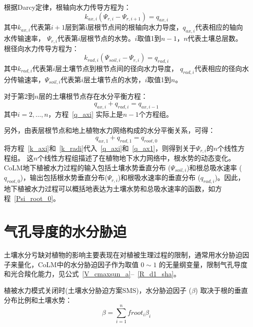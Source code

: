 根据Darcy定律，根轴向水力传导方程为：
\begin{equation}\label{k_axi}
k_{ax,i}\left(\Psi_{r,i}-\Psi_{r,i+1}\right)=q_{ax,i}
\end{equation}
其中$k_{ax,i}$代表第$i+1$层到第i层根节点间的根轴向水力导度，$q_{ax,i}$代表相应的轴向水传输速率，
$\Psi_{r,i}$代表第$i$层根节点的水势。$i$取值1到$n-1$，$n$代表土壤总层数。\\
根径向水力传导方程为：
\begin{equation}\label{k_radi}
k_{rad,i}\left(\Psi_{soil,i}-\Psi_{r,i}\right)=q_{rad,i}
\end{equation}
其中$k_{rad,i}$代表第$i$层土壤节点到根节点间的径向水力导度，
$q_{rad,i}$代表相应的径向水分传输速率，$\Psi_{soil,i}$代表第$i$层土壤节点的水势，$i$取值1到$n$。



对于第2到$n$层的土壤根节点存在水分平衡方程：
\begin{equation}\label{q_axi}
q_{a x, i}+q_{r a d, i}=q_{a x, i-1}
\end{equation}
其中$i=2, \ldots, n$，方程~\eqref{q_axi} 实际上是$n-1$个方程组。


另外，由表层根节点和地上植物水力网络构成的水分平衡关系，可得：
\begin{equation}\label{q_ax1}
q_{ax,1}+q_{rad, 1}=q_{root,0}
\end{equation}
将方程~\eqref{k_axi}和~\eqref{k_radi}代入~\eqref{q_axi}和~\eqref{q_ax1}，则得到关于$ \Psi_{r,i}$的$n$个线性方程组。
这$n$个线性方程组描述了在植物地下水力网络中，根水势的动态变化。CoLM地下植被水力过程的输入包括土壤水势垂直分布 ($\Psi_{soil,i}$)和根总吸水速率 ($q_{root,0}$)，输出包括根水势垂直分布($\Psi_{r,i}$)和根吸水速率的垂直分布 ($q_{rad,i}$)。因此，地下植被水力过程可以概括地表达为土壤水势和总吸水速率的函数，如方程~\eqref{Psi_root_0}。


\section{气孔导度的水分胁迫}\label{气孔导度的水分胁迫}
土壤水分亏缺对植物的影响主要表现在对植被生理过程的限制，通常用水分胁迫因子来量化，CoLM中的水分胁迫因子作为取值 $0\sim 1$ 的无量纲变量，限制气孔导度和光合羧化能力，见公式~\eqref{V_cmaxsun_a}--~\eqref{R_d1_sha}。

植被水力模式关闭时(土壤水分胁迫方案SMS)，水分胁迫因子 ($\beta$) 取决于根的垂直分布比例和土壤水势：
\begin{equation}\label{beta_0}
\beta=\sum_{i=1}^{n} froot_i \beta_{i}
\end{equation}

